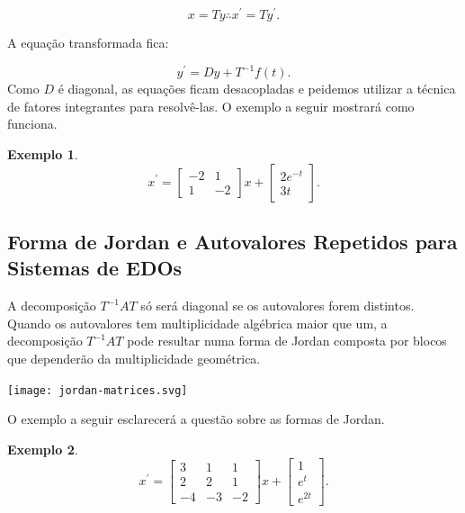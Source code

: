 \documentclass[a4paper,portuguese,9pt,final]{extarticle}
\newtheorem{example}{Exemplo}[section]
\begin{document}
\begin{multicols*}{2}
        $$x = Ty \therefore x^\prime = Ty^\prime.$$
        
        A equação transformada fica:
        
        $$y^\prime = Dy + T^{-1}f(t).$$ Como $D$ é diagonal, as equações ficam desacopladas e peidemos utilizar a técnica de fatores integrantes para resolvê-las. O exemplo a seguir mostrará como funciona.
        
        \begin{example}
            \begin{equation*}
                x^\prime = \begin{bmatrix}
                                     -2 & 1\\
                                     1 & -2
                                     \end{bmatrix} x + \begin{bmatrix} 2e^{-t} \\ 3t\end{bmatrix}.
            \end{equation*}    
        \end{example}
        
        \subsection{Forma de Jordan e Autovalores Repetidos para Sistemas de EDOs}
        
            A decomposição $T^{-1}AT$ só será diagonal se os autovalores forem distintos. Quando os autovalores tem multiplicidade algébrica maior que um, a decomposição $T^{-1}AT$ pode resultar numa forma de Jordan composta por blocos que dependerão da multiplicidade geométrica.
            
            \texttt{[image: jordan-matrices.svg]}
            
            O exemplo a seguir esclarecerá a questão sobre as formas de Jordan.
        
            \begin{example}
                \begin{equation*}
                    x^\prime = \begin{bmatrix}
                                         3 & 1 &1\\
                                     2 & 2 & 1\\
                                    -4 & -3 & -2
                                     \end{bmatrix} x + \begin{bmatrix} 1 \\ e^{t} \\ e^{2t} \end{bmatrix}.
                \end{equation*}     
            \end{example}
            

\end{multicols*}
\end{document}
